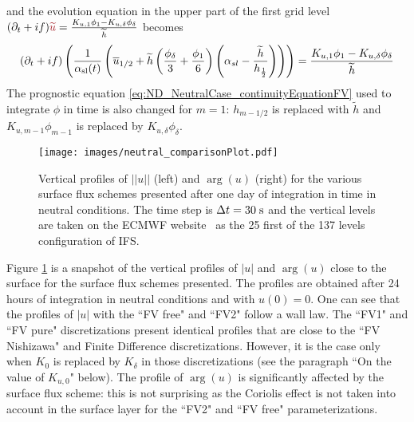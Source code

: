 and the evolution equation in the upper part of the first grid level
$ (\partial_t+if) \emphase{\widetilde{u}}
= \frac{K_{u, 1}\phi_1 - K_{u,\delta} \phi_{\delta}}{\widetilde{h}}$
becomes
\begin{equation}
	\label{eq:ND_NeutralCase_semiDiscreteEkmanEqFVfree}
	(\partial_t+if) \left(\frac{1}{\alpha_{\rm sl}(t)}
	\left(\overline{u}_{1/2} + \widetilde{h}
	\left(\frac{\phi_{\delta}}{3} + \frac{\phi_1}{6}\right)
	\left(\alpha_{sl} - \frac{\widetilde{h}}{h_{\frac{1}{2}}}\right)
	\right)\right)
	= \frac{K_{u, 1}\phi_1 - K_{u,\delta} \phi_{\delta}}{\widetilde{h}}
\end{equation}
The prognostic equation \eqref{eq:ND_NeutralCase_continuityEquationFV}
used to integrate $\phi$ in time
is also changed for $m=1$: $h_{m-1/2}$ is replaced
with $\widetilde{h}$ and $K_{u, m-1}\phi_{m-1}$ is replaced by
$K_{u,\delta}\phi_{\delta}$.
%
\begin{figure}[htpb]
	\centering
	\texttt{[image: images/neutral\_comparisonPlot.pdf]}
	\caption[Vertical profiles of $|u|$ and $\arg(u)$]
	{Vertical profiles of $||u||$ (left) and $\arg(u)$ (right)
	for the various surface flux schemes presented
	after one day of integration in time in neutral conditions.
	The time step is $\Delta t = 30 \;{\rm s}$
	and the vertical levels are taken
	on the ECMWF website\footnotemark ~ as the 25 first
	of the 137 levels configuration of IFS.
	}
	\label{fig:ND_NeutralCase_comparisonPlot}
\end{figure}
\par
Figure \ref{fig:ND_NeutralCase_comparisonPlot} is a snapshot of
the vertical profiles of $|u|$ and $\arg(u)$ close to the surface
for the surface flux schemes presented.
The profiles are obtained after 24 hours of integration in neutral
conditions and with $u(0) = 0$.
One can see that the profiles of $|u|$ with the ``FV free" and ``FV2"
follow a wall law. The ``FV1" and ``FV pure" discretizations
present identical profiles that are close to the ``FV Nishizawa" and
Finite Difference discretizations.
However, it is the case only when $K_0$ is
replaced by $K_{\delta}$ in those discretizations
(see the paragraph ``On the value of $K_{u,0}$" below).
The profile of $\arg(u)$ is significantly affected by the surface
flux scheme: this is not surprising as the Coriolis effect is
not taken into account in the surface layer for the ``FV2" and
``FV free" parameterizations.
